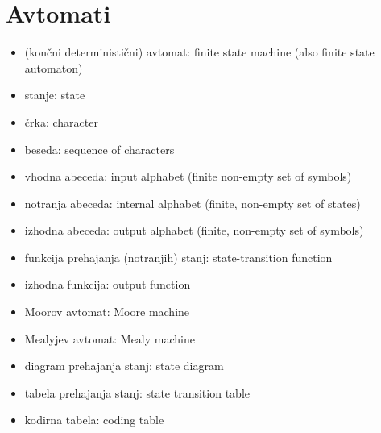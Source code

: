 \section*{Avtomati}
\begin{itemize}
\item (končni deterministični) avtomat: finite state machine (also finite state automaton)
\item stanje: state
\item črka: character
\item beseda: sequence of characters
\item vhodna abeceda: input alphabet (finite non-empty set of symbols)
\item notranja abeceda: internal alphabet (finite, non-empty set of states)
\item izhodna abeceda: output alphabet (finite, non-empty set of symbols)
\item funkcija prehajanja (notranjih) stanj: state-transition function
\item izhodna funkcija: output function
\item Moorov avtomat: Moore machine
\item Mealyjev avtomat: Mealy machine
\item diagram prehajanja stanj: state diagram
\item tabela prehajanja stanj: state transition table
\item kodirna tabela: coding table
\end{itemize}

